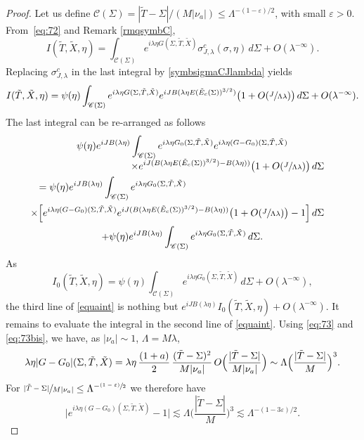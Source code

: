 \documentclass[11pt]{article}
\let\mathcal\mathscr
\let\epsilon\varepsilon
\theoremstyle{plain}
\theoremstyle{definition}
\begin{document}
\begin{proof}
Let us define $\mathcal{C}(\Sigma)=|\tilde T-\Sigma|/(M|\nu_a|)\leq \Lambda^{-(1-\epsilon)/2}$, with small $\epsilon>0$. From~\eqref{eq:72} and Remark \ref{rmqsymbC},
\[
I(\tilde T,\tilde X,\eta)=\int_{\mathcal{C}(\Sigma)}e^{i\lambda \eta G(\Sigma,\tilde T,\tilde X)}\sigma^{c}_{J,\lambda}(\sigma,\eta)\,d\Sigma+O(\lambda^{-\infty}).
\]
Replacing $\sigma^{c}_{J,\lambda}$ in the last integral by \eqref{symbsigmaCJlambda} yields
\[
I(\tilde T,\tilde X,\eta)=\psi(\eta)\int_{\mathcal{C}(\Sigma)}e^{i\lambda \eta G(\Sigma,\tilde T,\tilde X)}e^{iJB(\lambda\eta E(\tilde E_c(\Sigma))^{3/2})}\bigl(1+O(\sfrac{J}{\Lambda\lambda})\bigr)\,d\Sigma+O(\lambda^{-\infty}).
\]
The last integral can be re-arranged as follows
\begin{multline}\label{equaint}
\psi(\eta)e^{iJB(\lambda\eta)}\int_{\mathcal{C}(\Sigma)} e^{i\lambda \eta G_0(\Sigma,\tilde T,\tilde X)} e^{i\lambda \eta (G-G_0)(\Sigma,\tilde T,\tilde X)}
\\[
-5pt]
\shoveright{\times e^{iJ(B(\lambda\eta E(\tilde E_c(\Sigma))^{3/2})-B(\lambda\eta))}\bigl(1+O(\sfrac{J}{\Lambda\lambda})\bigr)\,d\Sigma}\\
\shoveleft{=\psi(\eta)e^{iJB(\lambda\eta)}\int_{\mathcal{C}(\Sigma)}e^{i\lambda \eta G_0(\Sigma,\tilde T,\tilde X)}}\\
\shoveright{\times \Big[e^{i\lambda \eta (G-G_0)(\Sigma,\tilde T,\tilde X)}e^{iJ(B(\lambda\eta E(\tilde E_c(\Sigma))^{3/2})-B(\lambda\eta))}\bigl(1+O(\sfrac{J}{\Lambda\lambda})\bigr)-1\Big]\,d\Sigma}
\\
+\psi(\eta)e^{iJB(\lambda\eta)}\int_{\mathcal{C}(\Sigma)}e^{i\lambda \eta G_0(\Sigma,\tilde T,\tilde X)}\,d\Sigma.
\end{multline}
As
\[
I_0(\tilde T,\tilde X,\eta)=\psi(\eta)\int_{\mathcal{C}(\Sigma)}e^{i\lambda \eta G_0(\Sigma,\tilde T,\tilde X)}\,d\Sigma+O(\lambda^{-\infty}),
\]
the third line of \eqref{equaint} is nothing but $e^{iJB(\lambda\eta)}I_0(\tilde T,\tilde X,\eta)+O(\lambda^{-\infty})$. It remains to evaluate the integral in the second line of \eqref{equaint}. Using \eqref{eq:73} and \eqref{eq:73bis}, we have, as $|\nu_a|\sim 1$, $\Lambda=M\lambda$,
\[
\lambda \eta |G-G_0|(\Sigma,\tilde T,\tilde X)=\lambda \eta\,\frac{(1+a)}{2}\,\frac{(\tilde T-\Sigma)^2}{M|\nu_a|}\,O\Bigl(\frac{|\tilde T-\Sigma|}{M|\nu_a|}\Bigr)\sim \Lambda\Big(\frac{|\tilde T-\Sigma|}{M}\Big)^3.
\]
For $\sfrac{|\tilde T-\Sigma|}{M|\nu_a|}\leq \Lambda^{-\sfrac{(1-\epsilon)}{2}}$ we therefore have
\[
\bigl|e^{i\lambda \eta (G-G_0)(\Sigma,\tilde T,\tilde X)}-1\bigr|\lesssim \Lambda\Big(\frac{|\tilde T-\Sigma|}{M}\Big)^3\lesssim \Lambda^{-(1-3\epsilon)/2}.
\]
\end{proof}
\end{document}
